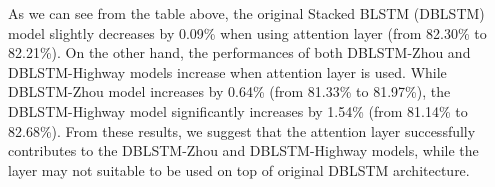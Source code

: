 {{\begin{table}
\end{table}

As we can see from the table above, the original Stacked BLSTM (DBLSTM) model slightly decreases by 0.09\% when using attention layer (from 82.30\% to 82.21\%). On the other hand, the performances of both DBLSTM-Zhou and DBLSTM-Highway models increase when attention layer is used. While DBLSTM-Zhou model increases by 0.64\% (from 81.33\% to 81.97\%), the DBLSTM-Highway model significantly increases by 1.54\% (from 81.14\% to 82.68\%). From these results, we suggest that the attention layer successfully contributes to the DBLSTM-Zhou and DBLSTM-Highway models, while the layer may not suitable to be used on top of original DBLSTM architecture.


}}
